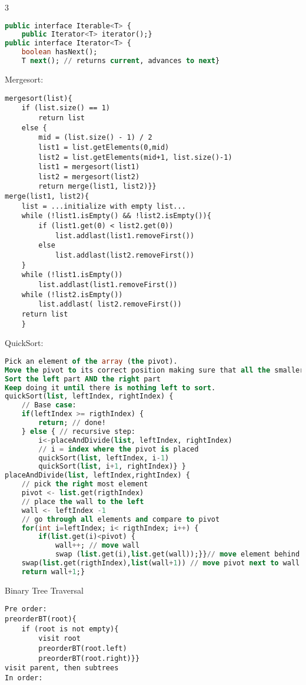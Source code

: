 \documentclass[10pt,landscape]{article}
\begin{document}
\begin{multicols}{3}
\begin{lstlisting}[language=SQL]
public interface Iterable<T> { 
    public Iterator<T> iterator();}
public interface Iterator<T> { 
    boolean hasNext();
    T next(); // returns current, advances to next}
\end{lstlisting}
Mergesort:
\begin{lstlisting}
mergesort(list){
    if (list.size() == 1)
        return list
    else {
        mid = (list.size() - 1) / 2
        list1 = list.getElements(0,mid)
        list2 = list.getElements(mid+1, list.size()-1) 
        list1 = mergesort(list1)
        list2 = mergesort(list2)
        return merge(list1, list2)}}
merge(list1, list2){
    list = ...initialize with empty list... 
    while (!list1.isEmpty() && !list2.isEmpty()){
        if (list1.get(0) < list2.get(0)) 
            list.addlast(list1.removeFirst())
        else
            list.addlast(list2.removeFirst())
    }
    while (!list1.isEmpty())
        list.addlast(list1.removeFirst()) 
    while (!list2.isEmpty())
        list.addlast( list2.removeFirst()) 
    return list
    }
\end{lstlisting}
QuickSort:
\begin{lstlisting}[language=SQL]
Pick an element of the array (the pivot).
Move the pivot to its correct position making sure that all the smaller elements are on its left and all the larger elements are on its right.
Sort the left part AND the right part
Keep doing it until there is nothing left to sort.
quickSort(list, leftIndex, rightIndex) {
    // Base case:
    if(leftIndex >= rigthIndex) {
        return; // done!
    } else { // recursive step:
        i<-placeAndDivide(list, leftIndex, rightIndex) 
        // i = index where the pivot is placed 
        quickSort(list, leftIndex, i-1)
        quickSort(list, i+1, rightIndex)} }
placeAndDivide(list, leftIndex,rightIndex) {
    // pick the right most element
    pivot <- list.get(rigthIndex) 
    // place the wall to the left
    wall <- leftIndex -1
    // go through all elements and compare to pivot
    for(int i=leftIndex; i< rigthIndex; i++) {
        if(list.get(i)<pivot) { 
            wall++; // move wall
            swap (list.get(i),list.get(wall));}}// move element behind wall
    swap(list.get(rigthIndex),list(wall+1)) // move pivot next to wall 
    return wall+1;}
\end{lstlisting}
Binary Tree Traversal
\begin{lstlisting}
Pre order:
preorderBT(root){  
	if (root is not empty){
		visit root
		preorderBT(root.left)
		preorderBT(root.right)}}
visit parent, then subtrees
In order: 

\end{lstlisting}
\end{multicols}
\end{document}
